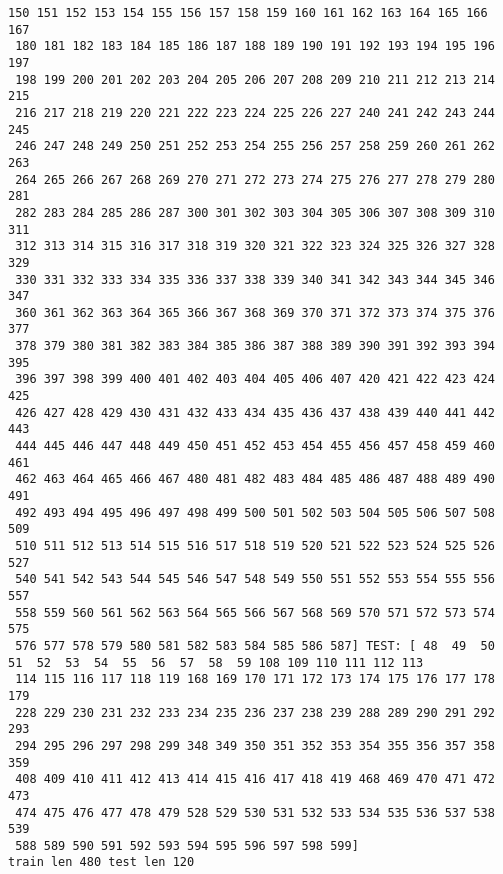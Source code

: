 \documentclass[11pt]{article}
\begin{document}
\begin{Verbatim}[commandchars=\\\{\}]
 150 151 152 153 154 155 156 157 158 159 160 161 162 163 164 165 166 167
 180 181 182 183 184 185 186 187 188 189 190 191 192 193 194 195 196 197
 198 199 200 201 202 203 204 205 206 207 208 209 210 211 212 213 214 215
 216 217 218 219 220 221 222 223 224 225 226 227 240 241 242 243 244 245
 246 247 248 249 250 251 252 253 254 255 256 257 258 259 260 261 262 263
 264 265 266 267 268 269 270 271 272 273 274 275 276 277 278 279 280 281
 282 283 284 285 286 287 300 301 302 303 304 305 306 307 308 309 310 311
 312 313 314 315 316 317 318 319 320 321 322 323 324 325 326 327 328 329
 330 331 332 333 334 335 336 337 338 339 340 341 342 343 344 345 346 347
 360 361 362 363 364 365 366 367 368 369 370 371 372 373 374 375 376 377
 378 379 380 381 382 383 384 385 386 387 388 389 390 391 392 393 394 395
 396 397 398 399 400 401 402 403 404 405 406 407 420 421 422 423 424 425
 426 427 428 429 430 431 432 433 434 435 436 437 438 439 440 441 442 443
 444 445 446 447 448 449 450 451 452 453 454 455 456 457 458 459 460 461
 462 463 464 465 466 467 480 481 482 483 484 485 486 487 488 489 490 491
 492 493 494 495 496 497 498 499 500 501 502 503 504 505 506 507 508 509
 510 511 512 513 514 515 516 517 518 519 520 521 522 523 524 525 526 527
 540 541 542 543 544 545 546 547 548 549 550 551 552 553 554 555 556 557
 558 559 560 561 562 563 564 565 566 567 568 569 570 571 572 573 574 575
 576 577 578 579 580 581 582 583 584 585 586 587] TEST: [ 48  49  50  51  52  53  54  55  56  57  58  59 108 109 110 111 112 113
 114 115 116 117 118 119 168 169 170 171 172 173 174 175 176 177 178 179
 228 229 230 231 232 233 234 235 236 237 238 239 288 289 290 291 292 293
 294 295 296 297 298 299 348 349 350 351 352 353 354 355 356 357 358 359
 408 409 410 411 412 413 414 415 416 417 418 419 468 469 470 471 472 473
 474 475 476 477 478 479 528 529 530 531 532 533 534 535 536 537 538 539
 588 589 590 591 592 593 594 595 596 597 598 599]
train len 480 test len 120

    \end{Verbatim}
\end{document}
